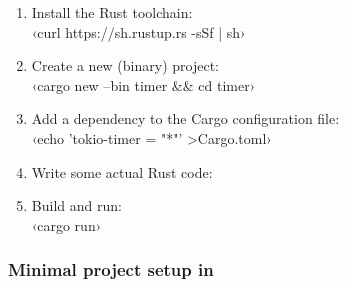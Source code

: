 \begin{enumerate}
  \item Install the Rust toolchain:\\
        ‹curl https://sh.rustup.rs -sSf | sh›
  \item Create a new (binary) project:\\
        ‹cargo new --bin timer && cd timer›
  \item Add a dependency to the Cargo configuration file:\\
        ‹echo 'tokio-timer = "*"' >Cargo.toml›
  \item Write some actual Rust code:\\
  \item Build and run:\\
        ‹cargo run›
\end{enumerate}


\newpage

\subsubsection{Minimal project setup in \cpp}

